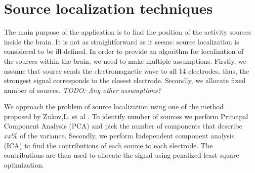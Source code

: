 \documentclass[]{article}   %
\begin{document}
\section{Source localization techniques}
The main purpose of the application is to find the position of the activity sources inside the brain. It is not as straightforward as it seems: source localization is considered to be ill-defined. In order to provide an algorithm for localization of the sources within the brain, we need to make multiple assumptions. Firstly, we assume that source sends the electromagnetic wave to all 14 electrodes, thus, the strongest signal corresponds to the closest electrode. Secondly, we allocate fixed number of sources. \emph{TODO: Any other assumptions?}

We approach the problem of source localization using one of the method proposed by Zukov,L. et al \cite{zhukov2000}. To identify number of sources we perform Principal Component Analysis (PCA) and pick the number of components that describe $xx\%$ of the variance. Secondly, we perform Independent component analysis (ICA) to find the contributions of each source to each electrode. The contributions are then used to allocate the signal using penalized least-square optimization.
\end{document}
